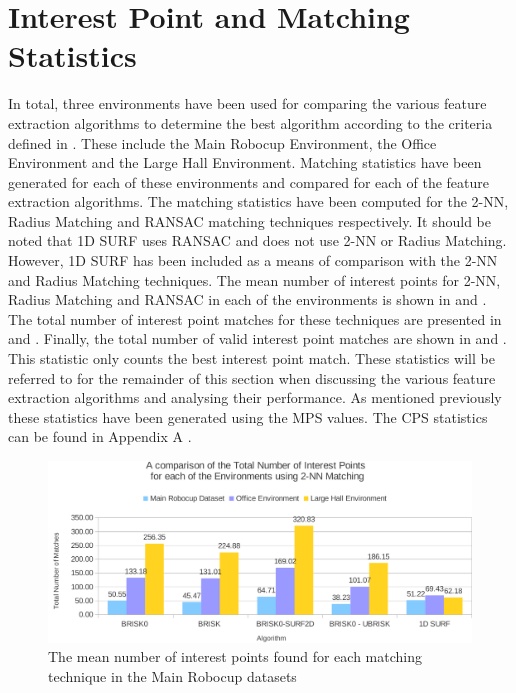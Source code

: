 \section{Interest Point and Matching Statistics}
\label{sec:matchingStats}
In total, three environments have been used for comparing the various feature extraction algorithms to determine the best algorithm according to the criteria defined in . These include the Main Robocup Environment, the Office Environment and the Large Hall Environment. Matching statistics have been generated for each of these environments and compared for each of the feature extraction algorithms. The matching statistics have been computed for the 2-NN, Radius Matching and RANSAC matching techniques respectively. It should be noted that 1D SURF uses RANSAC and does not use 2-NN or Radius Matching. However, 1D SURF has been included as a means of comparison with the 2-NN and Radius Matching techniques. The mean number of interest points for 2-NN, Radius Matching and RANSAC in each of the environments is shown in  and . The total number of interest point matches for these techniques are presented in  and . Finally, the total number of valid interest point matches are shown in  and . This statistic only counts the best interest point match. These statistics will be referred to for the remainder of this section when discussing the various feature extraction algorithms and analysing their performance. As mentioned previously these statistics have been generated using the MPS values. The CPS statistics can be found in Appendix A .\\

 \begin{figure}%
  \centering
    \includegraphics[width=1.0\textwidth]{../Drawings/Graphs/overall_tn_ip.pdf}
    \caption{The mean number of interest points found for each matching technique in the Main Robocup datasets} 
    \label{fig:overall_tn_ip}
 \end{figure}
 
